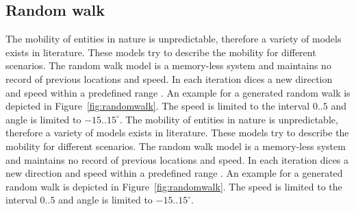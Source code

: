 \documentclass[master,english]{hgbthesis}
\begin{document}
\subsection{Random walk}
The mobility of entities in nature is unpredictable, therefore a variety of models exists in literature. These models try to describe the mobility for different scenarios. The random walk model is a memory-less system and maintains no record of previous locations and speed. In each iteration dices a new direction and speed within a predefined range \cite{Camp2002}. An example for a generated random walk is depicted in Figure~\ref{fig:randomwalk}. The speed is limited to the interval $0..5$ and angle is limited to $-15..15^\circ$.
The mobility of entities in nature is unpredictable, therefore a variety of models exists in literature. These models try to describe the mobility for different scenarios. The random walk model is a memory-less system and maintains no record of previous locations and speed. In each iteration dices a new direction and speed within a predefined range \cite{Camp2002}. An example for a generated random walk is depicted in Figure~\ref{fig:randomwalk}. The speed is limited to the interval $0..5$ and angle is limited to $-15..15^\circ$.
\end{document}
